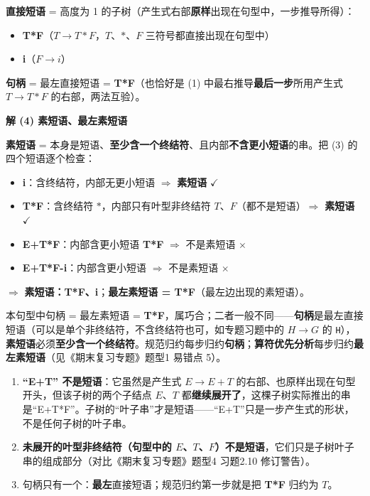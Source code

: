 \documentclass[12pt,a4paper,fontset=windows]{ctexart}
\newcommand{\ok}{\ensuremath{\checkmark}}
\newcommand{\bad}{\ensuremath{\times}}
\newcommand{\imp}{\ensuremath{\Rightarrow}}
\begin{document}
\textbf{直接短语} = 高度为 1 的子树（产生式右部\textbf{原样}出现在句型中，一步推导所得）：
\begin{itemize}
\item \textbf{T*F}（$T \to T*F$，$T$、$*$、$F$ 三符号都直接出现在句型中）
\item \textbf{i}（$F \to i$）
\end{itemize}

\textbf{句柄} = 最左直接短语 = \textbf{T*F}（也恰好是 (1) 中最右推导\textbf{最后一步}所用产生式 $T \to T*F$ 的右部，两法互验）。

\textbf{解 (4) 素短语、最左素短语}

\textbf{素短语} = 本身是短语、\textbf{至少含一个终结符}、且内部\textbf{不含更小短语}的串。把 (3) 的四个短语逐个检查：
\begin{itemize}
\item \textbf{i}：含终结符，内部无更小短语 \imp{} \textbf{素短语} \ok
\item \textbf{T*F}：含终结符 $*$，内部只有叶型非终结符 $T$、$F$（都不是短语）\imp{} \textbf{素短语} \ok
\item \textbf{E+T*F}：内部含更小短语 \textbf{T*F} \imp{} 不是素短语 \bad
\item \textbf{E+T*F-i}：内部含更小短语 \imp{} 不是素短语 \bad
\end{itemize}
\imp{} \textbf{素短语：T*F、i}；\textbf{最左素短语 = T*F}（最左边出现的素短语）。

\begin{tipbox}[句柄 vs 最左素短语]
本句型中句柄 = 最左素短语 = \textbf{T*F}，属巧合；二者一般不同——\textbf{句柄}是最左直接短语（可以是单个非终结符，不含终结符也可，如专题习题中的 $H \to G$ 的 \texttt{H}），\textbf{素短语}必须\textbf{至少含一个终结符}。规范归约每步归约\textbf{句柄}；\textbf{算符优先分析}每步归约\textbf{最左素短语}（见《期末复习专题》题型1 易错点 5）。
\end{tipbox}

\begin{warnbox}
\begin{enumerate}
\item \textbf{``E+T'' 不是短语}：它虽然是产生式 $E \to E+T$ 的右部、也原样出现在句型开头，但该子树的两个子结点 $E$、$T$ 都\textbf{继续展开了}，这棵子树实际推出的串是``E+T*F''。子树的``叶子串''才是短语——``E+T''只是一步产生式的形状，不是任何子树的叶子串。
\item \textbf{未展开的叶型非终结符（句型中的 $E$、$T$、$F$）不是短语}，它们只是子树叶子串的组成部分（对比《期末复习专题》题型4 习题2.10 修订警告）。
\item 句柄只有一个：\textbf{最左}直接短语；规范归约第一步就是把 \textbf{T*F} 归约为 $T$。
\end{enumerate}
\end{warnbox}
\end{document}
